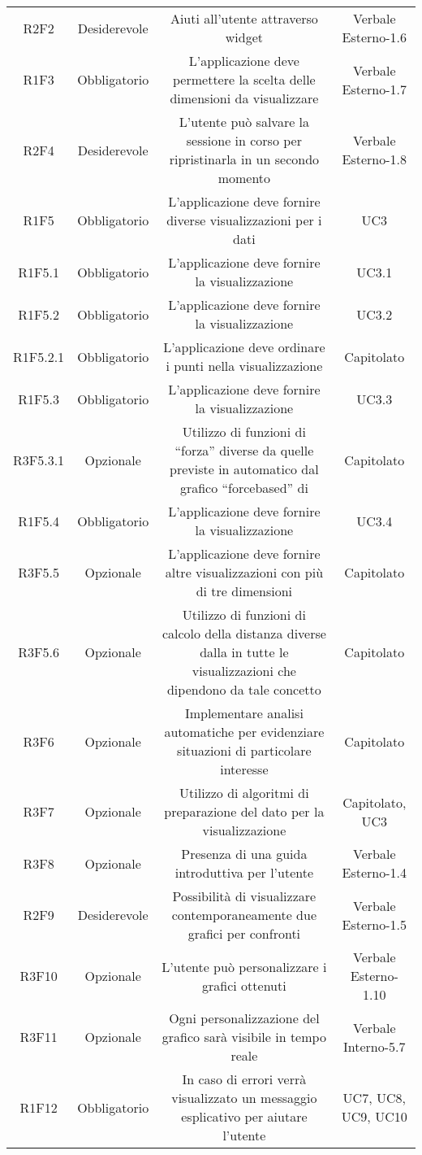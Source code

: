 \begin{center}
\begin{longtable}{C{\colA} C{\colB} C{\colC} C{\colA}}
 

R2F2 & Desiderevole & Aiuti all'utente attraverso widget & Verbale Esterno-1.6 \\
R1F3 & Obbligatorio & L'applicazione deve permettere la scelta delle dimensioni da visualizzare & Verbale Esterno-1.7\\
R2F4 & Desiderevole & L'utente può salvare la sessione in corso per ripristinarla in un secondo momento & Verbale Esterno-1.8\\
R1F5 & Obbligatorio & L'applicazione deve fornire diverse visualizzazioni per i dati & UC3\\
R1F5.1 & Obbligatorio & L'applicazione deve fornire la visualizzazione  & UC3.1\\
R1F5.2 & Obbligatorio & L'applicazione deve fornire la visualizzazione  & UC3.2\\
R1F5.2.1 & Obbligatorio & L'applicazione deve ordinare i punti nella visualizzazione  & Capitolato \\
R1F5.3 & Obbligatorio & L'applicazione deve fornire la visualizzazione  & UC3.3\\
R3F5.3.1 & Opzionale & Utilizzo di funzioni di “forza” diverse da quelle previste in automatico dal grafico “forcebased” di  & Capitolato\\
R1F5.4 & Obbligatorio & L'applicazione deve fornire la visualizzazione  & UC3.4 \\
R3F5.5 & Opzionale & L'applicazione deve fornire altre visualizzazioni con più di tre dimensioni & Capitolato\\
R3F5.6 & Opzionale & Utilizzo di funzioni di calcolo della distanza diverse dalla  in tutte le visualizzazioni che dipendono da tale concetto & Capitolato \\
R3F6 & Opzionale & Implementare analisi automatiche per evidenziare situazioni di particolare interesse & Capitolato\\
R3F7 & Opzionale & Utilizzo di algoritmi di preparazione del dato per la visualizzazione & Capitolato, UC3\\
R3F8 & Opzionale & Presenza di una guida introduttiva per l'utente & Verbale Esterno-1.4\\
R2F9 & Desiderevole & Possibilità di visualizzare contemporaneamente due grafici per confronti & Verbale Esterno-1.5\\
R3F10 & Opzionale & L'utente può personalizzare i grafici ottenuti & Verbale Esterno-1.10 \\
R3F11 & Opzionale & Ogni personalizzazione del grafico sarà visibile in tempo reale & Verbale Interno-5.7 \\
R1F12 & Obbligatorio & In caso di errori verrà visualizzato un messaggio esplicativo per aiutare l'utente & UC7, UC8, UC9, UC10\\

\end{longtable}
\end{center}



